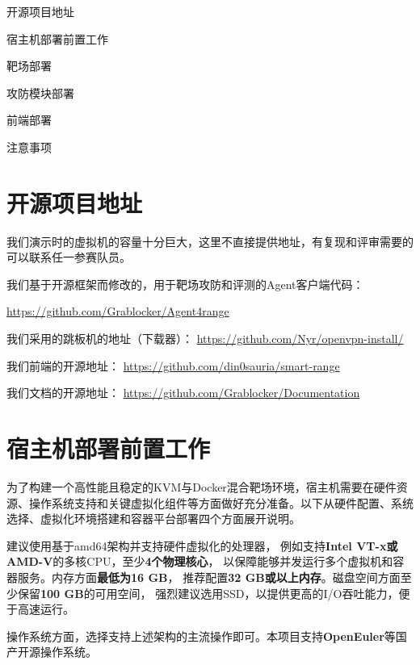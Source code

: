 \documentclass[lang=cn,10pt]{elegantbook}
\begin{document}
\begin{introduction}
    \item 开源项目地址
    \item 宿主机部署前置工作
    \item 靶场部署
    \item 攻防模块部署
    \item 前端部署
    \item 注意事项
\end{introduction}

\section{开源项目地址} 

我们演示时的虚拟机的容量十分巨大，这里不直接提供地址，有复现和评审需要的可以联系任一参赛队员。

我们基于开源框架而修改的，用于靶场攻防和评测的Agent客户端代码：

\href{https://github.com/Grablocker/Agent4range}{https://github.com/Grablocker/Agent4range}

我们采用的跳板机的地址（下载器）：
\href{https://github.com/Nyr/openvpn-install/}{https://github.com/Nyr/openvpn-install/}

我们前端的开源地址：
\href{https://github.com/din0sauria/smart_range}{https://github.com/din0sauria/smart-range}

我们文档的开源地址：
\href{https://github.com/Grablocker/Documentation}{https://github.com/Grablocker/Documentation}





\section{宿主机部署前置工作}

为了构建一个高性能且稳定的KVM与Docker混合靶场环境，宿主机需要在硬件资源、操作系统支持和关键虚拟化组件等方面做好充分准备。以下从硬件配置、系统选择、虚拟化环境搭建和容器平台部署四个方面展开说明。

\begin{proposition}
  建议使用基于amd64架构并支持硬件虚拟化的处理器，
  例如支持\textbf{Intel VT-x或AMD-V}的多核CPU，至少\textbf{4个物理核心}，
  以保障能够并发运行多个虚拟机和容器服务。内存方面\textbf{最低为16 GB}，
  推荐配置\textbf{32 GB或以上内存}。磁盘空间方面至少保留\textbf{100 GB}的可用空间，
  强烈建议选用SSD，以提供更高的I/O吞吐能力，便于高速运行。
  
  操作系统方面，选择支持上述架构的主流操作即可。本项目支持\textbf{OpenEuler}等国产开源操作系统。
\end{proposition}
\end{document}
